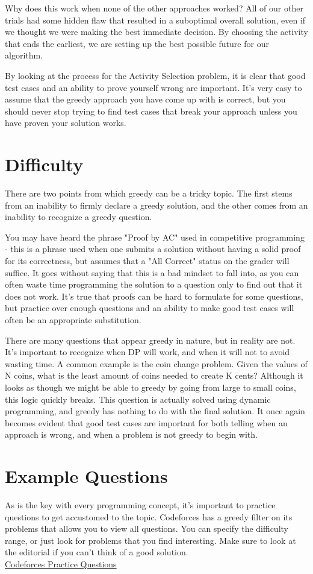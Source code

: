 \documentclass{article}
\begin{document}
    Why does this work when none of the other approaches worked? All of our other trials had some hidden flaw that resulted in a suboptimal overall solution, even if we thought we were making the best immediate decision. By choosing the activity that ends the earliest, we are setting up the best possible future for our algorithm.
    
    By looking at the process for the Activity Selection problem, it is clear that good test cases and an ability to prove yourself wrong are important. It's very easy to assume that the greedy approach you have come up with is correct, but you should never stop trying to find test cases that break your approach unless you have proven your solution works.

\section{Difficulty}
    There are two points from which greedy can be a tricky topic. The first stems from an inability to firmly declare a greedy solution, and the other comes from an inability to recognize a greedy question.
    
    You may have heard the phrase "Proof by AC" used in competitive programming - this is a phrase used when one submits a solution without having a solid proof for its correctness, but assumes that a "All Correct" status on the grader will suffice. It goes without saying that this is a bad mindset to fall into, as you can often waste time programming the solution to a question only to find out that it does not work. It's true that proofs can be hard to formulate for some questions, but practice over enough questions and an ability to make good test cases will often be an appropriate substitution.
    
    There are many questions that appear greedy in nature, but in reality are not. It's important to recognize when DP will work, and when it will not to avoid wasting time. A common example is the coin change problem. Given the values of N coins, what is the least amount of coins needed to create K cents? Although it looks as though we might be able to greedy by going from large to small coins, this logic quickly breaks. This question is actually solved using dynamic programming, and greedy has nothing to do with the final solution. It once again becomes evident that good test cases are important for both telling when an approach is wrong, and when a problem is not greedy to begin with.

\section{Example Questions}
    As is the key with every programming concept, it's important to practice questions to get accustomed to the topic. Codeforces has a greedy filter on its problems that allows you to view all questions. You can specify the difficulty range, or just look for problems that you find interesting. Make sure to look at the editorial if you can't think of a good solution.\\
    
    \href{https://codeforces.com/problemset?order=BY_SOLVED_DESC&tags=greedy}{Codeforces Practice Questions}
\end{document}
